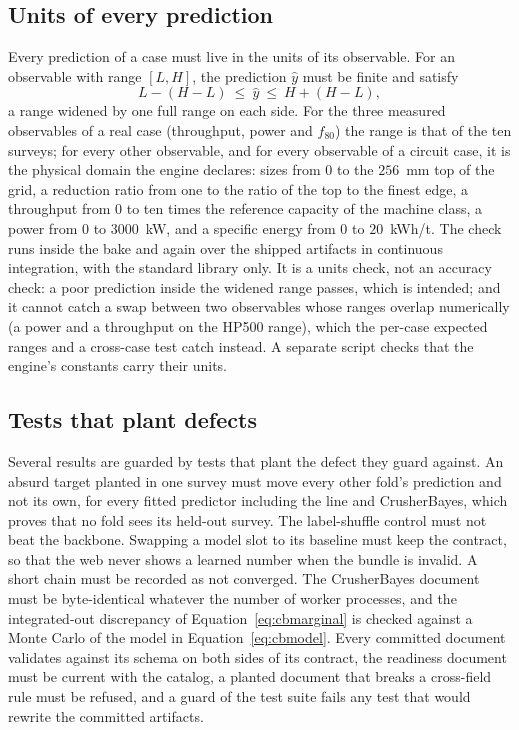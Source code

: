 \subsection{Units of every prediction}\label{sec:val-units}

Every prediction of a case must live in the units of its observable. For an observable with range $[L,H]$, the prediction $\hat y$ must be finite and satisfy
\begin{equation}
L - (H-L) \ \le\ \hat y\ \le\ H + (H-L),
\label{eq:units}
\end{equation}
a range widened by one full range on each side. For the three measured observables of a real case (throughput, power and $f_{80}$) the range is that of the
ten surveys; for every other observable, and for every observable of a circuit case, it is the physical domain the engine declares: sizes from $0$ to the
$256$~mm top of the grid, a reduction ratio from one to the ratio of the top to the finest edge, a throughput from $0$ to ten times the reference capacity of
the machine class, a power from $0$ to $3000$~kW, and a specific energy from $0$ to $20$~kWh/t. The check runs inside the bake and again over the shipped
artifacts in continuous integration, with the standard library only. It is a units check, not an accuracy check: a poor prediction inside the widened range
passes, which is intended; and it cannot catch a swap between two observables whose ranges overlap numerically (a power and a throughput on the HP500 range),
which the per-case expected ranges and a cross-case test catch instead. A separate script checks that the engine's constants carry their units.

\subsection{Tests that plant defects}\label{sec:val-adversarial}

Several results are guarded by tests that plant the defect they guard against. An absurd target planted in one survey must move every other fold's prediction
and not its own, for every fitted predictor including the line and CrusherBayes, which proves that no fold sees its held-out survey. The label-shuffle control
must not beat the backbone. Swapping a model slot to its baseline must keep the contract, so that the web never shows a learned number when the bundle is
invalid. A short chain must be recorded as not converged. The CrusherBayes document must be byte-identical whatever the number of worker processes, and the
integrated-out discrepancy of Equation~\eqref{eq:cbmarginal} is checked against a Monte Carlo of the model in Equation~\eqref{eq:cbmodel}. Every committed
document validates against its schema on both sides of its contract, the readiness document must be current with the catalog, a planted document that breaks
a cross-field rule must be refused, and a guard of the test suite fails any test that would rewrite the committed artifacts.

